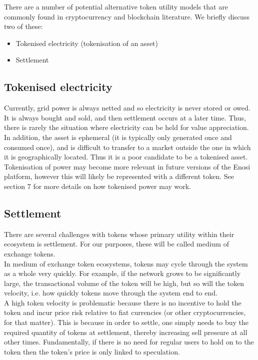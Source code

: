 \documentclass{article}
\theoremstyle{definition}
\theoremstyle{plain} %
\begin{document}
There are a number of potential alternative token utility models that are commonly found in cryptocurrency and blockchain literature. We briefly discuss two of these:

\begin{itemize}
\item{Tokenised electricity (tokenisation of an asset)}
\item{Settlement}
\end{itemize}

\subsection{Tokenised electricity}

Currently, grid power is always netted and so electricity is never stored or owed. It is always bought and sold, and then settlement occurs at a later time. Thus, there is rarely the situation where electricity can be held for value appreciation. In addition, the asset is ephemeral (it is typically only generated once and consumed once), and is difficult to transfer to a market outside the one in which it is geographically located. Thus it is a poor candidate to be a tokenised asset.\\

\noindent Tokenisation of power may become more relevant in future versions of the Enosi platform, however this will likely be represented with a different token. See section 7 for more details on how tokenised power may work.

\subsection{Settlement}

There are several challenges with tokens whose primary utility within their ecosystem is settlement. For our purposes, these will be called medium of exchange tokens.\\

\noindent In medium of exchange token ecosystems, tokens may cycle through the system as a whole very quickly. For example, if the network grows to be significantly large, the transactional volume of the token will be high, but so will the token velocity, i.e. how quickly tokens move through the system end to end.\\

\noindent A high token velocity is problematic because there is no incentive to hold the token and incur price risk relative to fiat currencies (or other cryptocurrencies, for that matter). This is because in order to settle, one simply needs to buy the required quantity of tokens at settlement, thereby increasing sell pressure at all other times. Fundamentally, if there is no need for regular users to hold on to the token then the token’s price is only linked to speculation.\\
\end{document}
